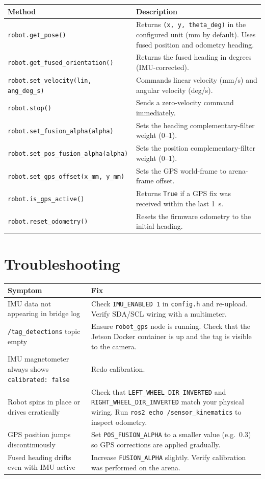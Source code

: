 \documentclass[12pt,letterpaper]{article}
\begin{document}
\begin{tabularx}{\textwidth}{lX}
  \toprule
  \textbf{Method} & \textbf{Description} \\
  \midrule
  \texttt{robot.get\_pose()} &
    Returns \texttt{(x, y, theta\_deg)} in the configured unit (mm by
    default). Uses fused position and odometry heading.\\[4pt]
  \texttt{robot.get\_fused\_orientation()} &
    Returns the fused heading in degrees (IMU-corrected). \\[4pt]
  \texttt{robot.set\_velocity(lin, ang\_deg\_s)} &
    Commands linear velocity (mm/s) and angular velocity (deg/s). \\[4pt]
  \texttt{robot.stop()} &
    Sends a zero-velocity command immediately. \\[4pt]
  \texttt{robot.set\_fusion\_alpha(alpha)} &
    Sets the heading complementary-filter weight (0--1). \\[4pt]
  \texttt{robot.set\_pos\_fusion\_alpha(alpha)} &
    Sets the position complementary-filter weight (0--1). \\[4pt]
  \texttt{robot.set\_gps\_offset(x\_mm, y\_mm)} &
    Sets the GPS world-frame to arena-frame offset. \\[4pt]
  \texttt{robot.is\_gps\_active()} &
    Returns \texttt{True} if a GPS fix was received within the last 1~s. \\[4pt]
  \texttt{robot.reset\_odometry()} &
    Resets the firmware odometry to the initial heading. \\
  \bottomrule
\end{tabularx}

\section{Troubleshooting}

\begin{tabularx}{\textwidth}{lX}
  \toprule
  \textbf{Symptom} & \textbf{Fix} \\
  \midrule
  IMU data not appearing in bridge log &
    Check \texttt{IMU\_ENABLED 1} in \texttt{config.h} and re-upload.
    Verify SDA/SCL wiring with a multimeter. \\[4pt]
  \texttt{/tag\_detections} topic empty &
    Ensure \texttt{robot\_gps} node is running. Check that the Jetson
    Docker container is up and the tag is visible to the camera. \\[4pt]
  IMU magnetometer always shows \texttt{calibrated: false} &
    Redo calibration. \\[4pt]
  Robot spins in place or drives erratically &
    Check that \texttt{LEFT\_WHEEL\_DIR\_INVERTED} and
    \texttt{RIGHT\_WHEEL\_DIR\_INVERTED} match your physical wiring.
    Run \texttt{ros2 echo /sensor\_kinematics} to inspect odometry. \\[4pt]
  GPS position jumps discontinuously &
    Set \texttt{POS\_FUSION\_ALPHA} to a smaller value (e.g.\ 0.3) so GPS
    corrections are applied gradually. \\[4pt]
  Fused heading drifts even with IMU active &
    Increase \texttt{FUSION\_ALPHA} slightly. Verify calibration was
    performed on the arena. \\
  \bottomrule
\end{tabularx}
\end{document}
